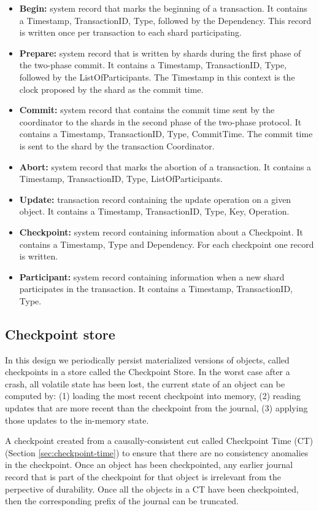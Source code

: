\documentclass[twoside]{article}
\begin{document}
\begin{itemize}
\item \textbf{Begin:} system record that marks the beginning of a
transaction. 
It contains a Timestamp, TransactionID, Type, followed by the Dependency.
This record is written once per transaction to each shard
participating.
\item \textbf{Prepare:} system record that is written by shards during the first phase 
of the two-phase commit. 
It contains a Timestamp, TransactionID, Type, followed by the ListOfParticipants.
The Timestamp in this context is the clock proposed by the shard as the commit time.
\item \textbf{Commit:} system record that contains the commit time sent by the coordinator
to the shards in the second phase of the two-phase protocol.
It contains a Timestamp, TransactionID, Type, CommitTime.
The commit time is sent to the shard by the transaction Coordinator.
\item \textbf{Abort:} system record that marks the abortion of a transaction.
It contains a Timestamp, TransactionID, Type, ListOfParticipants.
\item \textbf{Update:} transaction record containing the update operation on a given
object.
It contains a Timestamp, TransactionID, Type, Key, Operation.
\item \textbf{Checkpoint:} system record containing information about a Checkpoint.
It contains a Timestamp, Type and Dependency. 
For each checkpoint one record is written.
\item \textbf{Participant:} system record containing information when a new shard 
participates in the transaction.
It contains a Timestamp, TransactionID, Type.
\end{itemize}


\subsection{Checkpoint store}
\label{sec:checkpoint-store}

In this design we periodically persist materialized versions of objects, called
checkpoints in a store called the Checkpoint Store.  
In the worst case after a crash, all volatile state has been lost, the current
state of an object can be computed by: (1) loading the most recent checkpoint
into memory, (2) reading updates that are more recent than the checkpoint from
the journal, (3) applying those updates to the in-memory state.

A checkpoint created from a causally-consistent cut called Checkpoint Time
(CT) (Section \ref{sec:checkpoint-time}) to ensure that there are no consistency
anomalies in the checkpoint.
Once an object has been checkpointed, any earlier journal record that is part of 
the checkpoint for that object is irrelevant from the perpective of durability. 
Once all the objects in a CT have been checkpointed, then the corresponding
prefix of the journal can be truncated.
\end{document}
